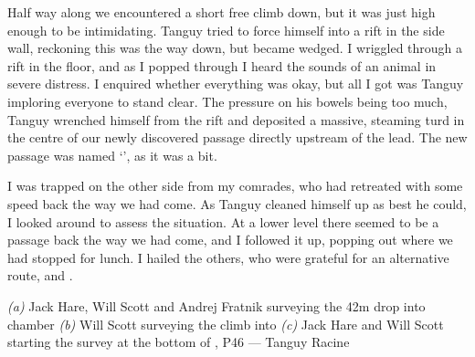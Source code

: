 Half way along we encountered a short free climb down, but it was just high enough to be intimidating. Tanguy tried to force himself into a rift in the side wall, reckoning this was the way down, but became wedged. I wriggled through a rift in the floor, and as I popped through I heard the sounds of an animal in severe distress. I enquired whether everything was okay, but all I got was Tanguy imploring everyone to stand clear. The pressure on his bowels being too much, Tanguy wrenched himself from the rift and deposited a massive, steaming turd in the centre of our newly discovered passage directly upstream of the lead. The new passage was named `', as it was a bit.
 
I was trapped on the other side from my comrades, who had retreated with some speed back the way we had come. As Tanguy cleaned himself up as best he could, I looked around to assess the situation. At a lower level there seemed to be a passage back the way we had come, and I followed it up, popping out where we had stopped for lunch. I hailed the others, who were grateful for an alternative route, and .

\begin{pagefigure}
    \centering
    \begin{subfigure}[t]{0.393\textwidth}
        \centering
        \caption{} \label{Hall of the Mountain King}
    \end{subfigure}
    \hfill
    \begin{subfigure}[t]{0.59\textwidth}
        \centering
        \caption{} \label{Colony}
    \end{subfigure}

    \vspace{0.3cm}
    \begin{subfigure}[t]{\textwidth}
    \centering
        \caption{} \label{Bottom of Blue Danube}
    \end{subfigure}
    
    \caption{
    \textit{(a)} Jack Hare, Will Scott and Andrej Fratnik surveying the 42m drop into \protect{} chamber
    \textit{(b)} Will Scott surveying the climb into \protect{}
    \textit{(c)} Jack Hare and Will Scott starting the survey at the bottom of \protect{}, P46 --- Tanguy Racine }

\end{pagefigure}


